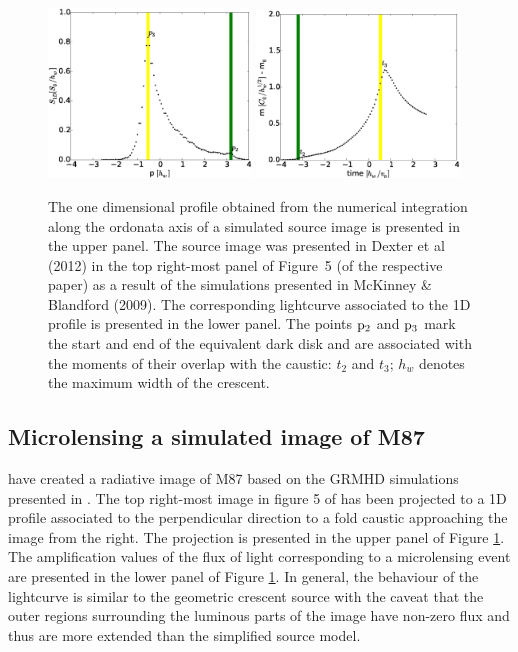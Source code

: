 \documentclass[usenatbib]{mn2e}
\begin{document}
\begin{figure}
\centering
    \includegraphics[width = 0.48\textwidth]{figures/M87_shape.eps}
        \includegraphics[width = 0.48\textwidth]{figures/M87_lc.eps}
\caption{\label{fig:M87_plots} The one dimensional profile obtained
  from the numerical integration along the ordonata axis of a
  simulated source image is presented in the upper panel. The source
  image was presented in Dexter et al (2012) in the top right-most
  panel of Figure~5 (of the respective paper) as a result of the
  simulations presented in McKinney \& Blandford (2009). The
  corresponding lightcurve associated to the 1D profile is presented
  in the lower panel. The points $\rm p_2$ and $\rm p_3$ mark the
  start and end of the equivalent dark disk and are associated with
  the moments of their overlap with the caustic: $t_2$ and $t_3$;
  $h_{w}$ denotes the maximum width of the crescent.}
\end{figure}


\subsection{Microlensing a simulated image of M87}

\cite{2012MNRAS.421.1517D} have created a radiative image of M87 based on the GRMHD simulations presented in \citep{2009MNRAS.394L.126M}. 
The top right-most image in figure 5 of \cite{2012MNRAS.421.1517D} has been projected to a 1D profile associated to the perpendicular 
direction to a fold caustic approaching the image from the right. The projection is presented in the upper panel of Figure \ref{fig:M87_plots}. 
The amplification values of the flux of light corresponding to a 
microlensing event are presented in the lower panel of Figure \ref{fig:M87_plots}. 
In general, the behaviour of the lightcurve is similar to the geometric crescent source with the caveat that the outer regions 
surrounding the luminous parts of the image have non-zero flux and thus are more extended than the simplified source model.
\end{document}
